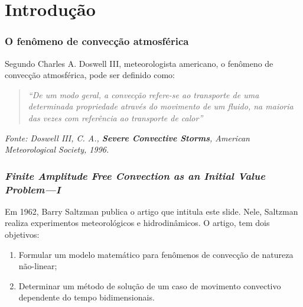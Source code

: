 
\section{Introdução} 



\begin{frame}
    \frametitle{O fenômeno de convecção atmosférica}

    Segundo Charles A. Doswell III, meteorologista americano, o fenômeno de convecção atmosférica, pode ser definido como:

    \vspace{1em} %

    \begin{quote}
        \itshape
        ``De um modo geral, a convecção refere-se ao transporte de uma determinada propriedade através do movimento de um fluido, na maioria das vezes com referência ao transporte de calor''
    \end{quote}

    \begin{flushright}
        \tiny
        \textit{Fonte: Doswell III, C. A., \textbf{Severe Convective Storms}, American Meteorological Society, 1996.}
    \end{flushright}
\end{frame}

\begin{frame}
    \frametitle{\textit{Finite Amplitude Free Convection as an Initial Value Problem—I}}
    
    Em 1962, Barry Saltzman publica o artigo que intitula este slide. Nele, Saltzman realiza experimentos meteorológicos e hidrodinâmicos. O artigo, tem dois objetivos:
    \vspace{0.5em}
    \begin{enumerate}
        \item Formular um modelo matemático para fenômenos de convecção de natureza não-linear;
        
        \item Determinar um método de solução de um caso de movimento convectivo dependente do tempo bidimensionais.
    \end{enumerate}
\end{frame}


